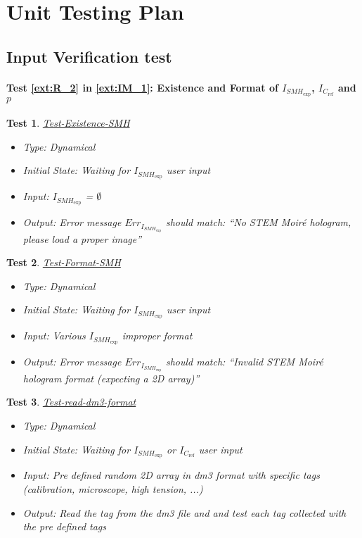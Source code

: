 \documentclass[12pt, titlepage]{article}
\newtheorem{Test}{Test}
\begin{document}
				
\section{Unit Testing Plan}
		
\subsection{Input Verification test}

\paragraph{Test \cref{ext:R_2} in \cref{ext:IM_1}: Existence and Format of $I_{\mathit{SMH}_{\text{exp}}}$, $I_{C_{\text{ref}}}$ and $p$}

\begin{Test}\normalfont\underline{Test-Existence-SMH}
\label{Test-Existence-SMH}
\begin{itemize}
\item Type: Dynamical
\item Initial State: Waiting for $I_{\mathit{SMH}_{\text{exp}}}$ user input
\item Input: $I_{\mathit{SMH}_{\text{exp}}}$ = $\emptyset$
\item Output: Error message $Err_{I_{\mathit{SMH}_{\text{exp}}}}$ should match: \enquote{No STEM Moir{\'e} hologram, please load a proper image}
\end{itemize}
\end{Test}

\begin{Test}\normalfont\underline{Test-Format-SMH}
\label{Test-Format-SMH}
\begin{itemize}
\item Type: Dynamical
\item Initial State: Waiting for $I_{\mathit{SMH}_{\text{exp}}}$ user input
\item Input: Various $I_{\mathit{SMH}_{\text{exp}}}$ improper format
\item Output: Error message $Err_{I_{\mathit{SMH}_{\text{exp}}}}$ should match: \enquote{Invalid STEM Moir{\'e} hologram format (expecting a 2D array)}
\end{itemize}
\end{Test}

\begin{Test}\normalfont\underline{Test-read-dm3-format}
\label{Test-read-dm3-format}
\begin{itemize}
\item Type: Dynamical
\item Initial State: Waiting for $I_{\mathit{SMH}_{\text{exp}}}$ or $I_{C_{\text{ref}}}$ user input
\item Input: Pre defined random 2D array in dm3 format with specific tags (calibration, microscope, high tension, ...)
\item Output: Read the tag from the dm3 file and and test each tag collected with the pre defined tags
\end{itemize}
\end{Test}
\end{document}
